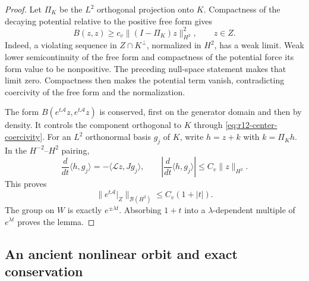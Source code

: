 \begin{proof}
Let $\Pi_K$ be the $L^2$ orthogonal projection onto $K$. Compactness
of the decaying potential relative to the positive free form gives
\begin{equation}\label{eq:r12-center-coercivity}
 B(z,z)\ge c_v\|(I-\Pi_K)z\|_{H^2}^2,
 \qquad z\in Z.
\end{equation}
Indeed, a violating sequence in $Z\cap K^\perp$, normalized in $H^2$,
has a weak limit. Weak lower semicontinuity of the free form and
compactness of the potential force its form value to be nonpositive.
The preceding null-space statement makes that limit zero. Compactness
then makes the potential term vanish, contradicting coercivity of the
free form and the normalization.

The form $B(e^{t\mathcal A}z,e^{t\mathcal A}z)$ is conserved, first
on the generator domain and then by density. It controls the component
orthogonal to $K$ through \eqref{eq:r12-center-coercivity}. For an
$L^2$ orthonormal basis $g_j$ of $K$, write
$h=z+k$ with $k=\Pi_Kh$. In the $H^{-2}$--$H^2$ pairing,
\[
 \frac d{dt}\langle h,g_j\rangle
 =-\langle\mathcal Lz,Jg_j\rangle,
 \qquad
 \left|\frac d{dt}\langle h,g_j\rangle\right|
       \le C_v\|z\|_{H^2}.
\]
This proves
\[
 \|e^{t\mathcal A}|_Z\|_{\mathcal B(H^2)}\le C_v(1+|t|).
\]
The group on $W$ is exactly $e^{\pm\lambda t}$. Absorbing $1+t$
into a $\lambda$-dependent multiple of $e^{\lambda t}$ proves the
lemma.
\end{proof}

\subsection{An ancient nonlinear orbit and exact conservation}

